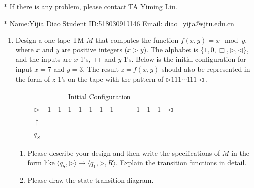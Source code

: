 \documentclass[12pt,a4paper]{article}
\theoremstyle{definition}
\begin{document}
\noindent

\noindent{}
\begin{center}
\footnotesize{\color{red}$*$ If there is any problem, please contact TA Yiming Liu. }

\footnotesize{\color{blue}$*$ Name:Yijia Diao  \quad Student ID:518030910146 \quad Email: diao\_yijia@sjtu.edu.cn}
\end{center}

\begin{enumerate}

\item
Design a one-tape TM $M$ that computes the function $f(x, y) = x \mod y$, where $x$ and $y$ are positive integers ($x > y$). The alphabet is $\{1, 0, \Box, \triangleright, \triangleleft\}$, and the inputs are $x$ 1's, $\Box$ and $y$ 1's. Below is the initial configuration for input $x=7$ and $y=3$. The result $z=f(x, y)$ should also be represented in the form of $z$ 1's on the tape with the pattern of $\triangleright 111 \cdots 111 \triangleleft$.
\begin{center}
	\begin{tabular}{ll|c|c|c|c|c|c|c|c|c|c|c|c|c|c}
		& \multicolumn{14}{c}{Initial Configuration}\\[5pt]
		\cline{2-16}
		& & $\triangleright$ &  1  & 1 & 1 & 1 & 1 & 1 & 1 & $\Box$ & 1 & 1 & 1 & $ \triangleleft$ & \\
		\cline{2-16}
		\multicolumn{2}{c}{} & \multicolumn{1}{c}{$\uparrow$} & \multicolumn{11}{c}{}\\[-4px]
		\multicolumn{2}{c}{} & \multicolumn{1}{c}{$q_S$} & \multicolumn{11}{c}{}	
	\end{tabular}
\end{center}

\begin{enumerate}
	\item
	Please describe your design and then write the specifications of $M$ in the form like $\langle q_S, \triangleright \rangle \rightarrow \langle q_1, \triangleright,  R\rangle$. Explain the transition functions in detail.
	
	\item
	Please draw the state transition diagram.
	

\end{enumerate}
\end{enumerate}
\end{document}
